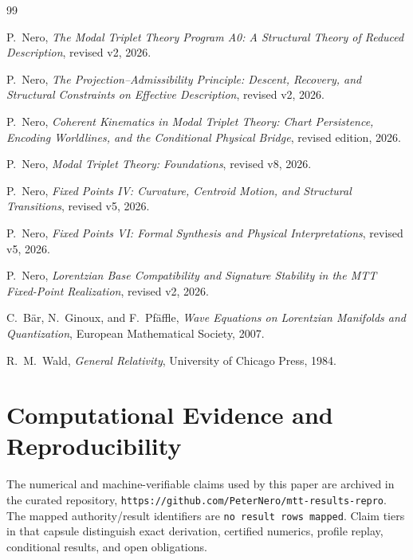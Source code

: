 \documentclass[11pt]{article}
\begin{document}
\begin{thebibliography}{99}

P.~Nero,
\newblock \emph{The Modal Triplet Theory Program A0: A Structural Theory of
Reduced Description}, revised v2, 2026.

P.~Nero,
\newblock \emph{The Projection--Admissibility Principle: Descent, Recovery,
and Structural Constraints on Effective Description}, revised v2, 2026.

P.~Nero,
\newblock \emph{Coherent Kinematics in Modal Triplet Theory: Chart
Persistence, Encoding Worldlines, and the Conditional Physical Bridge},
revised edition, 2026.

P.~Nero,
\newblock \emph{Modal Triplet Theory: Foundations}, revised v8, 2026.

P.~Nero,
\newblock \emph{Fixed Points IV: Curvature, Centroid Motion, and Structural
Transitions}, revised v5, 2026.

P.~Nero,
\newblock \emph{Fixed Points VI: Formal Synthesis and Physical
Interpretations}, revised v5, 2026.

P.~Nero,
\newblock \emph{Lorentzian Base Compatibility and Signature Stability in the
MTT Fixed-Point Realization}, revised v2, 2026.

C.~B\"ar, N.~Ginoux, and F.~Pf\"affle,
\newblock \emph{Wave Equations on Lorentzian Manifolds and Quantization},
European Mathematical Society, 2007.

R.~M.~Wald,
\newblock \emph{General Relativity},
University of Chicago Press, 1984.

\end{thebibliography}

\section*{Computational Evidence and Reproducibility}
The numerical and machine-verifiable claims used by this paper are archived in the curated repository, \texttt{https://github.com/PeterNero/mtt-results-repro}. The mapped authority/result identifiers are \texttt{no result rows mapped}. Claim tiers in that capsule distinguish exact derivation, certified numerics, profile replay, conditional results, and open obligations.
\end{document}
